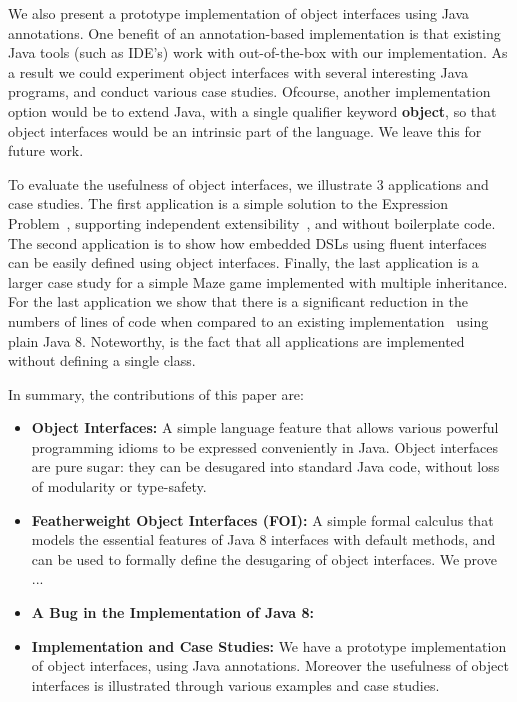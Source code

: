 We also present a prototype implementation of object interfaces using
Java annotations. One benefit of an annotation-based implementation 
is that existing Java tools (such as IDE's) work with out-of-the-box
with our implementation. As a result we could experiment object
interfaces with several interesting Java programs, and conduct various
case studies.  Ofcourse, another implementation option would be to
extend Java, with a single qualifier keyword {\bf object}, so that
object interfaces would be an intrinsic part of the language. We leave
this for future work. 

To evaluate the usefulness of object interfaces, we illustrate 3
applications and case studies. The first application is a simple 
solution to the Expression Problem~\cite{}, supporting independent 
extensibility~\cite{}, and without boilerplate code. The second
application is to show how embedded DSLs using fluent interfaces~\cite{} 
can be easily defined using object interfaces. Finally, the last
application is a larger case study for a simple Maze game implemented with 
multiple inheritance. For the last application we show that there is a
significant reduction in the numbers of lines of code when compared 
to an existing implementation~\cite{} using plain Java 8. 
Noteworthy, is the fact that all applications are implemented 
without defining a single class.

In summary, the contributions of this paper are:

\begin{itemize}

\item {\bf Object Interfaces:} A simple language feature that allows 
various powerful programming idioms to be expressed conveniently in
Java. Object interfaces are pure sugar: they can be desugared into standard Java 
code, without loss of modularity or type-safety. 

\item {\bf Featherweight Object Interfaces (FOI):} A simple formal calculus that models 
the essential features of Java 8 interfaces with default methods, and 
can be used to formally define the desugaring of object interfaces. 
We prove ...

\item {\bf A Bug in the Implementation of Java 8:}

\item {\bf Implementation and Case Studies:} We have a prototype implementation 
  of object interfaces, using Java annotations. Moreover the usefulness
  of object interfaces is illustrated through various examples and
  case studies.

\end{itemize}


